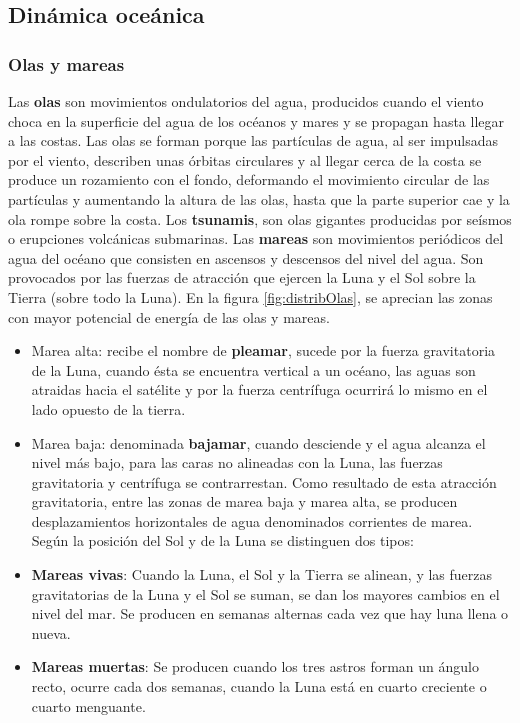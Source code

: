 \subsection{Dinámica oceánica}\label{header-n2}

\subsubsection{Olas y mareas}\label{header-n3}

Las \textbf{olas} son movimientos ondulatorios del agua, producidos
cuando el viento choca en la superficie del agua de los océanos y mares
y se propagan hasta llegar a las costas. Las olas se forman porque las
partículas de agua, al ser impulsadas por el viento, describen unas
órbitas circulares y al llegar cerca de la costa se produce un
rozamiento con el fondo, deformando el movimiento circular de las
partículas y aumentando la altura de las olas, hasta que la parte
superior cae y la ola rompe sobre la costa. Los \textbf{tsunamis}, son
olas gigantes producidas por seísmos o erupciones volcánicas submarinas.
Las \textbf{mareas} son movimientos periódicos del agua del océano que
consisten en ascensos y descensos del nivel del agua. Son provocados por
las fuerzas de atracción que ejercen la Luna y el Sol sobre la Tierra
(sobre todo la Luna). En la figura \autoref{fig:distribOlas}, se aprecian las zonas con mayor potencial de energía de las olas y mareas.

\begin{itemize}
\item
  Marea alta: recibe el nombre de \textbf{pleamar}, sucede por la fuerza
  gravitatoria de la Luna, cuando ésta se encuentra vertical a un
  océano, las aguas son atraidas hacia el satélite y por la fuerza
  centrífuga ocurrirá lo mismo en el lado opuesto de la tierra.
\item
  Marea baja: denominada \textbf{bajamar}, cuando desciende y el agua
  alcanza el nivel más bajo, para las caras no alineadas con la Luna,
  las fuerzas gravitatoria y centrífuga se contrarrestan. Como resultado
  de esta atracción gravitatoria, entre las zonas de marea baja y marea
  alta, se producen desplazamientos horizontales de agua denominados
  corrientes de marea. Según la posición del Sol y de la Luna se
  distinguen dos tipos:
\item
  \textbf{Mareas vivas}: Cuando la Luna, el Sol y la Tierra se alinean,
  y las fuerzas gravitatorias de la Luna y el Sol se suman, se dan los
  mayores cambios en el nivel del mar. Se producen en semanas alternas
  cada vez que hay luna llena o nueva.
\item
  \textbf{Mareas muertas}: Se producen cuando los tres astros forman un
  ángulo recto, ocurre cada dos semanas, cuando la Luna está en cuarto
  creciente o cuarto menguante.
\end{itemize}

